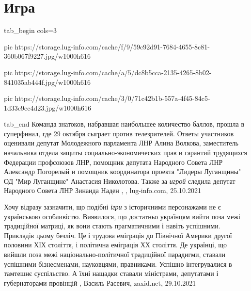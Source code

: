  
 
 
 
 
\chapter{Игра}

\ifcmt
  tab_begin cols=3

     pic https://storage.lug-info.com/cache/f/9/59c92d91-7684-4655-8c81-360b067f9227.jpg/w1000h616

     pic https://storage.lug-info.com/cache/a/5/dc8b5cca-2135-4265-8b02-841035ab444f.jpg/w1000h616

     pic https://storage.lug-info.com/cache/3/0/71c42b1b-557a-4f45-84c5-1d33c9ec4d23.jpg/w1000h616

  tab_end
\fi
Команда знатоков, набравшая наибольшее количество баллов, прошла в суперфинал,
где 29 октября сыграет против телезрителей.  Ответы участников оценивали
депутат Молодежного парламента ЛНР Алина Волкова, заместитель начальника отдела
защиты социально-экономических прав и гарантий трудящихся Федерации профсоюзов
ЛНР, помощник депутата Народного Совета ЛНР Александр Погорелый и помощник
координатора проекта "Лидеры Луганщины" ОД "Мир Луганщине" Анастасия
Николотова. Также за \emph{игрой} следила депутат Народного Совета ЛНР Зинаида
Наден
, 
, lug-info.com, 25.10.2021

Хочу відразу зазначити, що подібні \emph{ігри} з історичними персонажами не є
українською особливістю. Виявилося, що достатньо українцям вийти поза межі
традиційної матриці, як вони стають прагматичними і навіть успішними. Прикладів
цьому безліч. Це і трудова еміграція до Північної Америки другої половини ХІХ
століття, і політична еміграція ХХ століття. Де українці, що вийшли поза межі
національно-політичної традиційної парадигми, ставали успішними бізнесменами,
науковцями, правниками. Успішно інтегрувалися в тамтешнє суспільство. А їхні
нащадки ставали міністрами, депутатами і губернаторами провінцій
, 
Василь Расевич, zaxid.net, 29.10.2021

